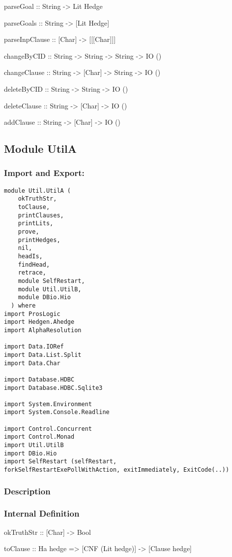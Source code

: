 \documentclass[../gr-final.tex]{subfiles}
\begin{document}
parseGoal :: String -> Lit Hedge

parseGoals :: String -> [Lit Hedge]

parseInpClause :: [Char] -> [[[Char]]]

changeByCID :: String -> String -> String -> IO ()

changeClause :: String -> [Char] -> String -> IO ()

deleteByCID :: String -> String -> IO ()

deleteClause :: String -> [Char] -> IO ()

addClause :: String -> [Char] -> IO ()

\subsection{Module UtilA}
\subsubsection{Import and Export:}
\begin{lstlisting}
module Util.UtilA (
    okTruthStr,
    toClause,
    printClauses,
    printLits,
    prove,
    printHedges,    
    nil,
    headIs,
    findHead,
    retrace,
    module SelfRestart,
    module Util.UtilB, 
    module DBio.Hio
  ) where
import ProsLogic
import Hedgen.Ahedge
import AlphaResolution

import Data.IORef
import Data.List.Split
import Data.Char

import Database.HDBC
import Database.HDBC.Sqlite3

import System.Environment
import System.Console.Readline

import Control.Concurrent
import Control.Monad
import Util.UtilB
import DBio.Hio
import SelfRestart (selfRestart,
forkSelfRestartExePollWithAction, exitImmediately, ExitCode(..))

\end{lstlisting}
\subsubsection{Description}

\subsubsection{Internal Definition}
okTruthStr :: [Char] -> Bool

toClause :: Ha hedge => [CNF (Lit hedge)] -> [Clause hedge]
\end{document}
